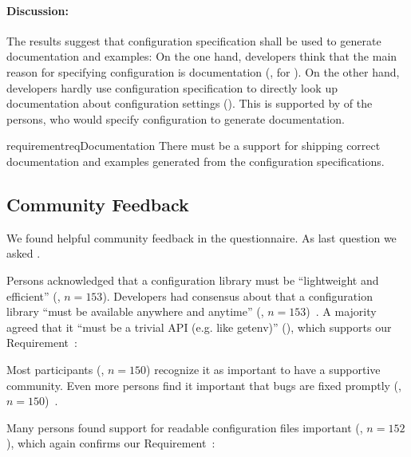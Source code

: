 \paragraph{Discussion:}
The results suggest that configuration specification shall be used to generate documentation and examples:
On the one hand, developers think that the main reason for specifying configuration is documentation (, for ).
On the other hand, developers hardly use configuration specification to directly look up documentation about configuration settings ().
This is supported by  of the persons, who would specify configuration to generate documentation.

\begin{restatable}{requirement}{reqDocumentation}
There must be a support for shipping correct documentation and examples generated from the configuration specifications.
\end{restatable}












\subsection{Community Feedback}

\methodQuestion{}
We found helpful community feedback in the questionnaire.
As last question we asked .

Persons acknowledged that a configuration library must be \enquote{lightweight and efficient} (, $n=153$).
Developers had consensus about that a configuration library \enquote{must be available anywhere and anytime} (, $n=153$)~\cite{raab2017challenges}.
A majority agreed that it \enquote{must be a trivial API (e.g. like getenv)} (), which supports our Requirement~:
\reqSimple*

Most participants (, $n=150$) recognize it as important to have a supportive community.
Even more persons find it important that bugs are fixed promptly (, $n=150$)~\cite{raab2017challenges}.

Many persons found support for readable configuration files important (, $n=152$), which again confirms our Requirement~:
\reqLegacy*






